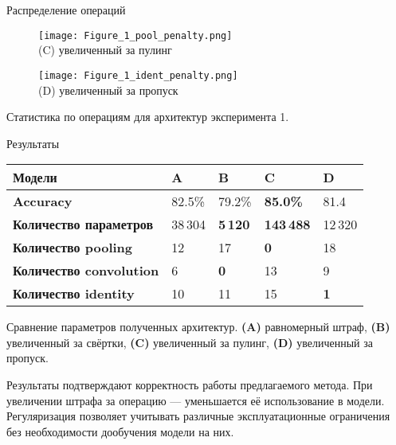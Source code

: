 \documentclass{beamer}
\begin{document}
\begin{frame}{Распределение операций}

\begin{figure}[!ht]
    \centering
    \begin{minipage}[t]{0.48\linewidth}
        \centering
        \texttt{[image: Figure\_1\_pool\_penalty.png]}\\
        (C) увеличенный за пулинг
    \end{minipage}\hfill
    \begin{minipage}[t]{0.48\linewidth}
        \centering
        \texttt{[image: Figure\_1\_ident\_penalty.png]}\\
        (D) увеличенный за пропуск
    \end{minipage}

    
    \label{fig3}
\end{figure}
 Статистика по операциям для архитектур эксперимента 1.   
\end{frame}
\begin{frame}[t]{Результаты}

  
  \begin{table}[h!]
    \centering
    \small
   
   \begin{tabular}{b{4.5cm}|b{1.2cm}|m{1.2cm}|m{1.2cm}|m{1.2cm}||}
   \hline
     \textbf{Модели} & \textbf{A} & \textbf{B} & \textbf{C} & \textbf{D} \\
    \hline
    \hline
    \textbf{Accuracy} &  82.5\% & 79.2\% &  \textbf{85.0\%} & 81.4\\
    \hline
    \textbf{Количество параметров} & 38\,304 & \textbf{5\,120} & \textbf{143\,488} &12\,320 \\
    \hline
    \textbf{Количество pooling} & 12 & 17 & \textbf{0} &18\\
    \hline
    \textbf{Количество convolution} & 6 & \textbf{0} & 13& 9 \\
    \hline
    \textbf{Количество identity} & 10 & 11 & 15 & \textbf{1} \\
    \hline
    \end{tabular}
     Сравнение параметров полученных архитектур. \textbf{(A)} равномерный штраф, 
             \textbf{(B)} увеличенный за свёртки, 
             \textbf{(C)} увеличенный за пулинг, 
             \textbf{(D)} увеличенный за пропуск.
  \end{table}

    Результаты подтверждают корректность работы предлагаемого метода. При увеличении штрафа за операцию --- уменьшается её использование в модели. Регуляризация позволяет учитывать различные эксплуатационные ограничения без необходимости дообучения модели на них.
\end{frame}
\end{document}
